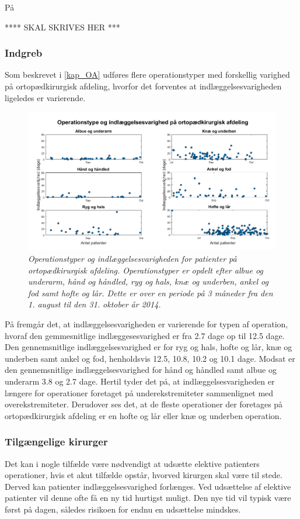 \noindent
På 

**** SKAL SKRIVES HER ***


\subsubsection{Indgreb}
Som beskrevet i \ref{kap_OA} udføres flere operationstyper med forskellig varighed på ortopædkirurgisk afdeling, hvorfor det forventes at indlæggelsesvarigheden ligeledes er varierende. 


\begin{figure}[H]
	\centering
	\includegraphics[scale=0.5]{figures/operaogindlaeg}
	\caption{\textit{Operationstyper og indlæggelsesvarigheden for patienter på ortopædkirurgisk afdeling. Operationstyper er opdelt efter albue og underarm, hånd og håndled, ryg og hals, knæ og underben, ankel og fod samt hofte og lår. Dette er over en periode på 3 måneder fra den 1. august til den 31. oktober år 2014.}}
	\label{opvsindlaegtid}
\end{figure}


\noindent
På  fremgår det, at indlæggelsesvarigheden er varierende for typen af operation, hvoraf den gemmesnitlige indlæggesesvarighed er fra 2.7 dage op til 12.5 dage.  Den gennemsnitlige  indlæggelsesvarighed er for ryg og hals, hofte og lår, knæ og underben samt ankel og fod, henholdsvis 12.5, 10.8, 10.2 og 10.1 dage. Modsat er den gennemsnitlige indlæggelsesvarighed for hånd og håndled samt albue og underarm 3.8 og 2.7 dage. Hertil tyder det på, at indlæggelsesvarigheden er længere for operationer foretaget på underekstremiteter sammenlignet med overekstremiteter. Derudover ses det, at de fleste operationer der foretages på ortopædkirurgisk afdeling er en hofte og lår eller knæ og underben operation. 



\subsubsection{Tilgængelige kirurger}
Det kan i nogle tilfælde være nødvendigt at udsætte elektive patienters operationer, hvis et akut tilfælde opstår, hvorved kirurgen skal være til stede. Derved kan patienter indlæggelsesvarighed forlænges. Ved udsættelse af elektive patienter vil denne ofte få en ny tid hurtigst muligt. Den nye tid vil typisk være først på dagen, således risikoen for endnu en udsættelse mindskes.